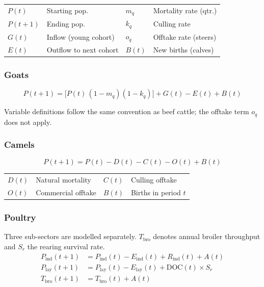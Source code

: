 {\small
\begin{tabular}{@{}p{}@{\;}p{}@{\enspace}p{}@{\;}p{}@{}}
$P(t)$   & Starting pop.          & $m_q$  & Mortality rate (qtr.) \\
$P(t+1)$ & Ending pop.            & $k_q$  & Culling rate \\
$G(t)$   & Inflow (young cohort)  & $o_q$  & Offtake rate (steers) \\
$E(t)$   & Outflow to next cohort & $B(t)$ & New births (calves) \\
\end{tabular}}

\subsubsection{Goats}
\begin{equation}
P(t+1) = \bigl[P(t)\,(1 - m_q)(1 - k_q)\bigr] + G(t) - E(t) + B(t)
\end{equation}

Variable definitions follow the same convention as beef cattle; the offtake term $o_q$ does not apply.

\subsubsection{Camels}
\begin{equation}
P(t+1) = P(t) - D(t) - C(t) - O(t) + B(t)
\end{equation}

{\small
\begin{tabular}{@{}p{}@{\;}p{}@{\enspace}p{}@{\;}p{}@{}}
$D(t)$ & Natural mortality  & $C(t)$ & Culling offtake \\
$O(t)$ & Commercial offtake & $B(t)$ & Births in period $t$ \\
\end{tabular}}

\subsubsection{Poultry}

Three sub-sectors are modelled separately. $T_{\mathrm{bro}}$ denotes annual broiler throughput and $S_r$ the rearing survival rate.
\begin{align}
P_{\mathrm{ind}}(t+1) &= P_{\mathrm{ind}}(t) - E_{\mathrm{ind}}(t) + R_{\mathrm{ind}}(t) + A(t) \\
P_{\mathrm{lay}}(t+1) &= P_{\mathrm{lay}}(t) - E_{\mathrm{lay}}(t) + \mathrm{DOC}(t) \times S_r \\
T_{\mathrm{bro}}(t+1) &= T_{\mathrm{bro}}(t) + A(t)
\end{align}

